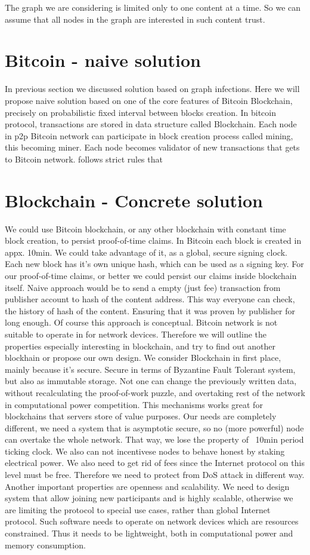 \documentclass[nostrict]{szablonPG}
\begin{document}
The graph we are considering is limited only to one content at a time. So we can assume that all nodes in the graph are interested in such content trust.

\section{Bitcoin - naive solution}
In previous section we discussed solution based on graph infections. Here we will propose naive solution based on one of the core features of Bitcoin Blockchain, precisely on probabilistic fixed interval between blocks creation. In bitcoin protocol, transactions are stored in data structure called Blockchain. Each node in p2p Bitcoin network can participate in block creation process called mining, this becoming miner. Each node becomes validator of new transactions that gets to Bitcoin network. follows strict rules that 

\section{Blockchain - Concrete solution}
We could use Bitcoin blockchain, or any other blockchain with constant time block creation, to persist proof-of-time claims. In Bitcoin each block is created in appx. 10min. We could take advantage of it, as a global, secure signing clock. Each new block has it's own unique hash, which can be used as a signing key. For our proof-of-time claims, or better we could persist our claims inside blockchain itself. Naive approach would be to send a empty (just fee) transaction from publisher account to hash of the content address. This way everyone can check, the history of hash of the content. Ensuring that it was proven by publisher for long enough. Of course this approach is conceptual. Bitcoin network is not suitable to operate in for network devices. Therefore we will outline the properties especially interesting in blockchain, and try to find out another blockhain or propose our own design. We consider Blockchain in first place, mainly because it's secure. Secure in terms of Byzantine Fault Tolerant system, but also as immutable storage. Not one can change the previously written data, without recalculating the proof-of-work puzzle, and overtaking rest of the network in computational power competition. This mechanisms works great for blockchains that servers store of value purposes. Our needs are completely different, we need a system that is asymptotic secure, so no (more powerful) node can overtake the whole network. That way, we lose the property of ~10min period ticking clock. We also can not incentivese nodes to behave honest by staking electrical power. We also need to get rid of fees since the Internet protocol on this level must be free. Therefore we need to protect from DoS attack in different way. Another important properties are openness and scalability. We need to design system that allow joining new participants and is highly scalable, otherwise we are limiting the protocol to special use cases, rather than global Internet protocol. Such software needs to operate on network devices which are resources constrained. Thus it needs to be lightweight, both in computational power and memory consumption.
\end{document}

